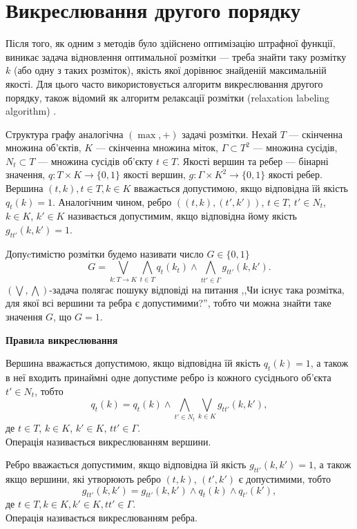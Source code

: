 \section{Викреслювання другого порядку}

Після того, як одним з методів було здійснено оптимізацію штрафної функції, 
виникає задача відновлення оптимальної розмітки --- треба знайти таку розмітку $k$
(або одну з таких розміток), якість якої дорівнює знайденій максимальній якості.
Для цього часто використовується алгоритм викреслювання другого порядку, також
відомий як алгоритм релаксації розмітки (relaxation labeling algorithm) \cite{savchynskyy,koval,rossi, Vodolazskii:2015}.

Структура графу аналогічна $(\max,+)$ задачі розмітки. Нехай $T$ --- скінченна
множина об'єктів, $K$ --- скінченна множина міток, $\Gamma \subset T^2$ --- множина сусідів, 
$N_t\subset T$ --- множина сусідів об'єкту $t\in T$.
Якості вершин та ребер --- бінарні значення,
 $q:T\times K\rightarrow\{0,1\}$ якості вершин, 
$g:\Gamma\times K^2\rightarrow\{0,1\}$ якості ребер. Вершина $(t,k), t\in T, k\in K$ вважається
допустимою, якщо відповідна їй якість $q_t(k)=1$. Аналогічним чином, ребро 
$((t,k),(t',k'))$, $t\in T$, $t'\in N_t$, $k\in K$, $k'\in K$ називається допустимим, якщо відповідна йому якість $g_{tt'}(k,k')=1$.

Допуcтимістю розмітки будемо називати
число $G\in\{0,1\}$
\begin{equation*}
      G=\bigvee_{k: T \rightarrow K} \bigwedge_{t\in T}q_t(k_t)\wedge\bigwedge_{tt' \in \Gamma} g_{tt'}(k,k').
  \end{equation*}
$(\bigvee, \bigwedge)$-задача полягає пошуку відповіді на питання ,,Чи існує 
така розмітка, для якої всі вершини та ребра є допустимими?'', тобто чи можна 
знайти таке значення $G$, що $G=1$.

\textbf{Правила викреслювання}

Вершина вважається допустимою, якщо відповідна їй якість $q_t(k)=1$, 
а також в неї входить принаймні одне допустиме ребро із кожного сусіднього
об'єкта $t'\in N_t$, тобто
\begin{equation*}
    q_t(k) = q_t(k)\wedge\bigwedge_{t'\in N_t}\bigvee_{k\in K}g_{tt'}(k,k'),
\end{equation*}
де $t\in T$, $k\in K$, $k'\in K$, $tt'\in\Gamma$.\\ 
Операція називається викреслюванням вершини.

Ребро вважається допустимим, якщо відповідна їй якість $g_{tt'}(k,k')=1$,
а також якщо вершини, які утворюють ребро $(t,k)$, $(t',k')$ є допустимими, тобто
\begin{equation*}
    g_{tt'}(k,k') = g_{tt'}(k,k')\wedge q_t(k)\wedge q_{t'}(k'),
\end{equation*}
де $t\in T, k\in K, k'\in K, tt'\in\Gamma$.\\
Операція називається викреслюванням ребра.


